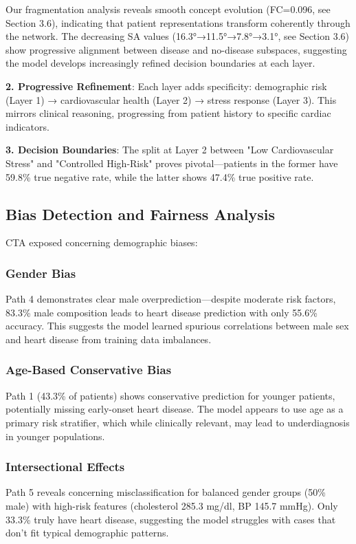 Our fragmentation analysis reveals smooth concept evolution (FC=0.096, see Section 3.6), indicating that patient representations transform coherently through the network. The decreasing SA values (16.3°→11.5°→7.8°→3.1°, see Section 3.6) show progressive alignment between disease and no-disease subspaces, suggesting the model develops increasingly refined decision boundaries at each layer.

\textbf{2. Progressive Refinement}: Each layer adds specificity: demographic risk (Layer 1) → cardiovascular health (Layer 2) → stress response (Layer 3). This mirrors clinical reasoning, progressing from patient history to specific cardiac indicators.

\textbf{3. Decision Boundaries}: The split at Layer 2 between "Low Cardiovascular Stress" and "Controlled High-Risk" proves pivotal—patients in the former have 59.8\% true negative rate, while the latter shows 47.4\% true positive rate.

\subsection{Bias Detection and Fairness Analysis}

CTA exposed concerning demographic biases:

\subsubsection{Gender Bias}
Path 4 demonstrates clear male overprediction—despite moderate risk factors, 83.3\% male composition leads to heart disease prediction with only 55.6\% accuracy. This suggests the model learned spurious correlations between male sex and heart disease from training data imbalances.

\subsubsection{Age-Based Conservative Bias}
Path 1 (43.3\% of patients) shows conservative prediction for younger patients, potentially missing early-onset heart disease. The model appears to use age as a primary risk stratifier, which while clinically relevant, may lead to underdiagnosis in younger populations.

\subsubsection{Intersectional Effects}
Path 5 reveals concerning misclassification for balanced gender groups (50\% male) with high-risk features (cholesterol 285.3 mg/dl, BP 145.7 mmHg). Only 33.3\% truly have heart disease, suggesting the model struggles with cases that don't fit typical demographic patterns.

